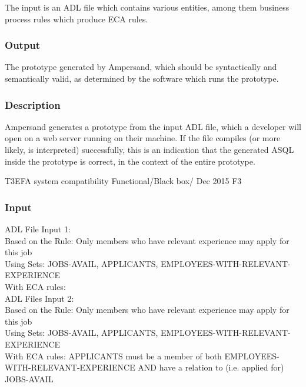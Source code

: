 \documentclass[12pt]{report}
\begin{document}
The input is an ADL file which contains various entities, among them business
process rules which produce ECA rules.

\vspace{-12pt}\subsubsection*{Output}

The prototype generated by Ampersand, which should be syntactically and
semantically valid, as determined by the software which runs the prototype.

\vspace{-12pt}\subsubsection*{Description}

Ampersand generates a prototype from the input ADL file, which a developer will
open on a web server running on their machine. If the file compiles (or more
likely, is interpreted) successfully, this is an indication that the generated
ASQL inside the prototype is correct, in the context of the entire prototype. 



\systemTest
{T3}{EFA system compatibility}
{Functional/Black box/ }
{Dec 2015}
{F3}
\vspace{-12pt}\subsubsection*{Input}
ADL File Input 1: \\
	Based on the Rule: Only members who have relevant experience may apply for 
	this 
	job \\
	Using Sets: JOBS-AVAIL, APPLICANTS, EMPLOYEES-WITH-RELEVANT-EXPERIENCE \\
	With ECA rules:\\
	ADL Files Input 2:\\
	Based on the Rule: Only members who have relevant experience may apply for 
	this 
	job \\
	Using Sets: JOBS-AVAIL, APPLICANTS, EMPLOYEES-WITH-RELEVANT-EXPERIENCE \\
	With ECA rules: APPLICANTS must be a member of both 
	EMPLOYEES-WITH-RELEVANT-EXPERIENCE AND have a relation to (i.e. applied 
	for) 
	JOBS-AVAIL \\
	
\end{document}
